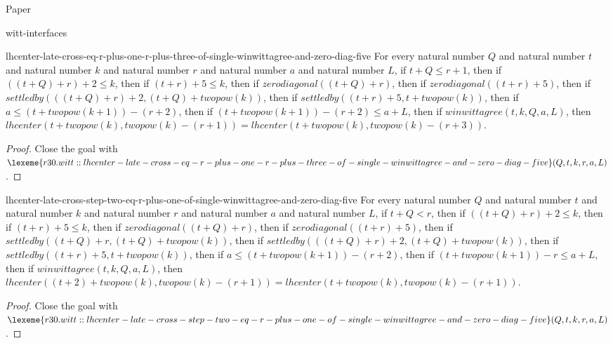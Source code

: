 \begin{lexlean}{Paper}
\begin{section}{witt-interfaces}
  \begin{theorem}{lhcenter-late-cross-eq-r-plus-one-r-plus-three-of-single-winwittagree-and-zero-diag-five}
  For every natural number \(Q\) and natural number \(t\) and natural number \(k\) and natural number \(r\) and natural number \(a\) and natural number \(L\), if \(t + Q ≤ r + 1\), then if \(((t + Q) + r) + 2 ≤ k\), then if \((t + r) + 5 ≤ k\), then if \(zerodiagonal((t + Q) + r)\), then if \(zerodiagonal((t + r) + 5)\), then if \(settledby(((t + Q) + r) + 2, (t + Q) + twopow(k))\), then if \(settledby((t + r) + 5, t + twopow(k))\), then if \(a ≤ (t + twopow(k + 1)) - (r + 2)\), then if \((t + twopow(k + 1)) - (r + 2) ≤ a + L\), then if \(winwittagree(t, k, Q, a, L)\), then \(lhcenter(t + twopow(k), twopow(k) - (r + 1)) = lhcenter(t + twopow(k), twopow(k) - (r + 3))\).
  \begin{proof}
  Close the goal with \(\lexeme{r30.witt::lhcenter-late-cross-eq-r-plus-one-r-plus-three-of-single-winwittagree-and-zero-diag-five}(Q, t, k, r, a, L)\).
  \end{proof}
  \end{theorem}

  \begin{theorem}{lhcenter-late-cross-step-two-eq-r-plus-one-of-single-winwittagree-and-zero-diag-five}
  For every natural number \(Q\) and natural number \(t\) and natural number \(k\) and natural number \(r\) and natural number \(a\) and natural number \(L\), if \(t + Q < r\), then if \(((t + Q) + r) + 2 ≤ k\), then if \((t + r) + 5 ≤ k\), then if \(zerodiagonal((t + Q) + r)\), then if \(zerodiagonal((t + r) + 5)\), then if \(settledby((t + Q) + r, (t + Q) + twopow(k))\), then if \(settledby(((t + Q) + r) + 2, (t + Q) + twopow(k))\), then if \(settledby((t + r) + 5, t + twopow(k))\), then if \(a ≤ (t + twopow(k + 1)) - (r + 2)\), then if \((t + twopow(k + 1)) - r ≤ a + L\), then if \(winwittagree(t, k, Q, a, L)\), then \(lhcenter((t + 2) + twopow(k), twopow(k) - (r + 1)) = lhcenter(t + twopow(k), twopow(k) - (r + 1))\).
  \begin{proof}
  Close the goal with \(\lexeme{r30.witt::lhcenter-late-cross-step-two-eq-r-plus-one-of-single-winwittagree-and-zero-diag-five}(Q, t, k, r, a, L)\).
  \end{proof}
  \end{theorem}


\end{section}
\end{lexlean}

